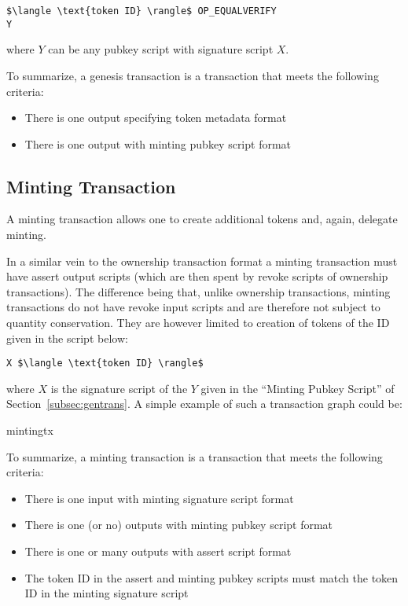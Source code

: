 \documentclass[9pt,oneside]{amsart}
\begin{document}
\begin{multicols}{2}
\begin{lstlisting}[title={\textbf{Minting PubKey Script}}]
$\langle \text{token ID} \rangle$ OP_EQUALVERIFY
Y
\end{lstlisting}
where $Y$ can be any pubkey script with signature script $X$. 

To summarize, a genesis transaction is a transaction that meets the following criteria:
\begin{itemize}
    \item There is one output specifying token metadata format
    \item There is one output with minting pubkey script format
\end{itemize}

\subsection{Minting Transaction}
A minting transaction allows one to create additional tokens and, again, delegate minting.

In a similar vein to the ownership transaction format a minting transaction must have assert output scripts (which are then spent by revoke scripts of ownership transactions). The difference being that, unlike ownership transactions, minting transactions do not have revoke input scripts and are therefore not subject to quantity conservation. They are however limited to creation of tokens of the ID given in the script below:

\begin{lstlisting}[title={\textbf{Minting Signature Script}}]
X $\langle \text{token ID} \rangle$
\end{lstlisting}
where $X$ is the signature script of the $Y$ given in the ``Minting Pubkey Script'' of Section~\ref{subsec:gentrans}. A simple example of such a transaction graph could be: 
\begin{center}
{mintingtx}
\end{center}

To summarize, a minting transaction is a transaction that meets the following criteria:
\begin{itemize}
    \item There is one input with minting signature script format
    \item There is one (or no) outputs with minting pubkey script format
    \item There is one or many outputs with assert script format
    \item The token ID in the assert and minting pubkey scripts must match the token ID in the minting signature script
\end{itemize}


\end{multicols}
\end{document}
